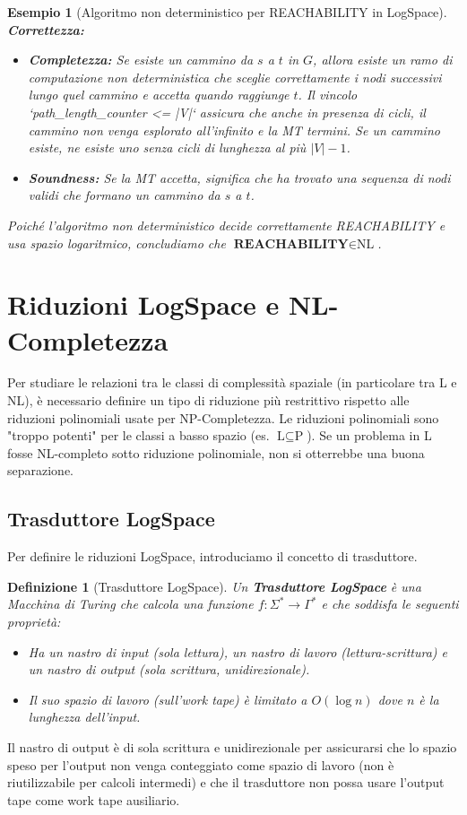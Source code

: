 \documentclass[a4paper]{article}
\newtheorem{definition}{Definizione}[section]
\newtheorem{example}{Esempio}[section]
\begin{document}
\begin{example}[Algoritmo non deterministico per REACHABILITY in LogSpace]
\textbf{Correttezza:}
\begin{itemize}
    \item \textbf{Completezza:} Se esiste un cammino da $s$ a $t$ in $G$, allora esiste un ramo di computazione non deterministica che sceglie correttamente i nodi successivi lungo quel cammino e accetta quando raggiunge $t$. Il vincolo `path_length_counter <= |V|` assicura che anche in presenza di cicli, il cammino non venga esplorato all'infinito e la MT termini. Se un cammino esiste, ne esiste uno senza cicli di lunghezza al più $|V|-1$.
    \item \textbf{Soundness:} Se la MT accetta, significa che ha trovato una sequenza di nodi validi che formano un cammino da $s$ a $t$.
\end{itemize}
Poiché l'algoritmo non deterministico decide correttamente REACHABILITY e usa spazio logaritmico, concludiamo che $\textbf{REACHABILITY} \in \text{NL}$.
\end{example}

\section{Riduzioni LogSpace e NL-Completezza}

Per studiare le relazioni tra le classi di complessità spaziale (in particolare tra L e NL), è necessario definire un tipo di riduzione più restrittivo rispetto alle riduzioni polinomiali usate per NP-Completezza. Le riduzioni polinomiali sono "troppo potenti" per le classi a basso spazio (es. $\text{L} \subseteq \text{P}$). Se un problema in L fosse NL-completo sotto riduzione polinomiale, non si otterrebbe una buona separazione.

\subsection{Trasduttore LogSpace}

Per definire le riduzioni LogSpace, introduciamo il concetto di trasduttore.

\begin{definition}[Trasduttore LogSpace]
Un \textbf{Trasduttore LogSpace} è una Macchina di Turing che calcola una funzione $f: \Sigma^* \to \Gamma^*$ e che soddisfa le seguenti proprietà:
\begin{itemize}
    \item Ha un nastro di input (sola lettura), un nastro di lavoro (lettura-scrittura) e un nastro di output (sola scrittura, unidirezionale).
    \item Il suo spazio di lavoro (sull'work tape) è limitato a $O(\log n)$ dove $n$ è la lunghezza dell'input.
\end{itemize}
\end{definition}
Il nastro di output è di sola scrittura e unidirezionale per assicurarsi che lo spazio speso per l'output non venga conteggiato come spazio di lavoro (non è riutilizzabile per calcoli intermedi) e che il trasduttore non possa usare l'output tape come work tape ausiliario.
\end{document}
